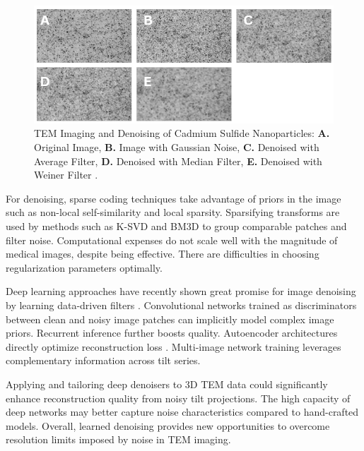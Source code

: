 \begin{figure}[thbp]
    \centering
    \includegraphics[width=.8\textwidth]{img/Denoising .png}
    \caption{TEM Imaging and Denoising of Cadmium Sulfide Nanoparticles: \textbf{A.} Original Image, \textbf{B.} Image with Gaussian Noise, \textbf{C.} Denoised with Average Filter, \textbf{D.} Denoised with Median Filter, \textbf{E.} Denoised with Weiner Filter \cite{6168375}.
}\label{fig: Filtering Method on Denoising}
\end{figure}

For denoising, sparse coding techniques take advantage of priors in the image such as non-local self-similarity and local sparsity. Sparsifying transforms are used by methods such as K-SVD  \cite{Elad2006} and BM3D to group comparable patches and filter noise. Computational expenses do not scale well with the magnitude of medical images, despite being effective. There are difficulties in choosing regularization parameters optimally.
\vspace{10pt}

Deep learning approaches have recently shown great promise for image denoising by learning data-driven filters \cite{Zhang2017}. Convolutional networks trained as discriminators between clean and noisy image patches can implicitly model complex image priors. Recurrent inference further boosts quality\cite{Zhang2017}. Autoencoder architectures directly optimize reconstruction loss \cite{Zhang2017}. Multi-image network training leverages complementary information across tilt series.
\vspace{10pt}

Applying and tailoring deep denoisers to 3D TEM data could significantly enhance reconstruction quality from noisy tilt projections. The high capacity of deep networks may better capture noise characteristics compared to hand-crafted models. Overall, learned denoising provides new opportunities to overcome resolution limits imposed by noise in TEM imaging.

